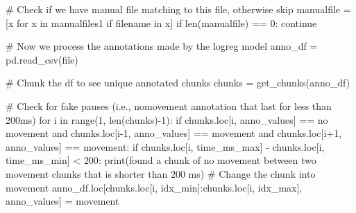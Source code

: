 \documentclass[
  letterpaper,
  DIV=11,
  numbers=noendperiod]{scrreprt}
\newenvironment{Shaded}{\begin{snugshade}}{\end{snugshade}}
\newcommand{\BuiltInTok}[1]{\textcolor[rgb]{0.00,0.23,0.31}{#1}}
\newcommand{\CommentTok}[1]{\textcolor[rgb]{0.37,0.37,0.37}{#1}}
\newcommand{\ControlFlowTok}[1]{\textcolor[rgb]{0.00,0.23,0.31}{#1}}
\newcommand{\DecValTok}[1]{\textcolor[rgb]{0.68,0.00,0.00}{#1}}
\newcommand{\KeywordTok}[1]{\textcolor[rgb]{0.00,0.23,0.31}{#1}}
\newcommand{\NormalTok}[1]{\textcolor[rgb]{0.00,0.23,0.31}{#1}}
\newcommand{\OperatorTok}[1]{\textcolor[rgb]{0.37,0.37,0.37}{#1}}
\newcommand{\StringTok}[1]{\textcolor[rgb]{0.13,0.47,0.30}{#1}}
\begin{document}
\begin{Shaded}
\begin{Highlighting}[]
        \CommentTok{\# Check if we have manual file matching to this file, otherwise skip}
\NormalTok{        manualfile }\OperatorTok{=}\NormalTok{ [x }\ControlFlowTok{for}\NormalTok{ x }\KeywordTok{in}\NormalTok{ manualfiles1 }\ControlFlowTok{if}\NormalTok{ filename }\KeywordTok{in}\NormalTok{ x]}
        \ControlFlowTok{if} \BuiltInTok{len}\NormalTok{(manualfile) }\OperatorTok{==} \DecValTok{0}\NormalTok{:}
            \ControlFlowTok{continue}

        \CommentTok{\# Now we process the annotations made by the logreg model}
\NormalTok{        anno\_df }\OperatorTok{=}\NormalTok{ pd.read\_csv(}\BuiltInTok{file}\NormalTok{)}

        \CommentTok{\# Chunk the df to see unique annotated chunks}
\NormalTok{        chunks }\OperatorTok{=}\NormalTok{ get\_chunks(anno\_df)}

        \CommentTok{\# Check for fake pauses (i.e., nomovement annotation that last for less than 200ms)}
        \ControlFlowTok{for}\NormalTok{ i }\KeywordTok{in} \BuiltInTok{range}\NormalTok{(}\DecValTok{1}\NormalTok{, }\BuiltInTok{len}\NormalTok{(chunks)}\OperatorTok{{-}}\DecValTok{1}\NormalTok{):}
            \ControlFlowTok{if}\NormalTok{ chunks.loc[i, }\StringTok{\textquotesingle{}anno\_values\textquotesingle{}}\NormalTok{] }\OperatorTok{==} \StringTok{\textquotesingle{}no movement\textquotesingle{}} \KeywordTok{and}\NormalTok{ chunks.loc[i}\OperatorTok{{-}}\DecValTok{1}\NormalTok{, }\StringTok{\textquotesingle{}anno\_values\textquotesingle{}}\NormalTok{] }\OperatorTok{==} \StringTok{\textquotesingle{}movement\textquotesingle{}} \KeywordTok{and}\NormalTok{ chunks.loc[i}\OperatorTok{+}\DecValTok{1}\NormalTok{, }\StringTok{\textquotesingle{}anno\_values\textquotesingle{}}\NormalTok{] }\OperatorTok{==} \StringTok{\textquotesingle{}movement\textquotesingle{}}\NormalTok{:}
                \ControlFlowTok{if}\NormalTok{ chunks.loc[i, }\StringTok{\textquotesingle{}time\_ms\_max\textquotesingle{}}\NormalTok{] }\OperatorTok{{-}}\NormalTok{ chunks.loc[i, }\StringTok{\textquotesingle{}time\_ms\_min\textquotesingle{}}\NormalTok{] }\OperatorTok{\textless{}} \DecValTok{200}\NormalTok{:}
                    \BuiltInTok{print}\NormalTok{(}\StringTok{\textquotesingle{}found a chunk of no movement between two movement chunks that is shorter than 200 ms\textquotesingle{}}\NormalTok{)}
                    \CommentTok{\# Change the chunk into movement}
\NormalTok{                    anno\_df.loc[chunks.loc[i, }\StringTok{\textquotesingle{}idx\_min\textquotesingle{}}\NormalTok{]:chunks.loc[i, }\StringTok{\textquotesingle{}idx\_max\textquotesingle{}}\NormalTok{], }\StringTok{\textquotesingle{}anno\_values\textquotesingle{}}\NormalTok{] }\OperatorTok{=} \StringTok{\textquotesingle{}movement\textquotesingle{}}


\end{Highlighting}
\end{Shaded}
\end{document}
